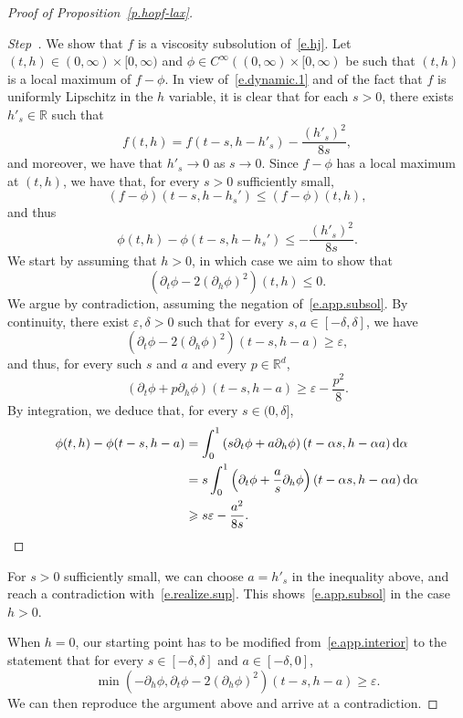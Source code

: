 \documentclass[10pt]{amsart}
\theoremstyle{definition}\newtheorem{defi}[theo]{Definition}\newtheorem{rema}[theo]{Remark}\newtheorem{exam}[theo]{Example}\newtheorem{exem}[theo]{Example}\newtheorem{nota}[theo]{Notation}
\newcommand{\R}{\mathbb{R}}
\newcommand{\Rd}{{\mathbb{R}^d}}
\renewcommand{\d}{\mathrm{d}}
\newcommand{\1}{\mathds{1}}
\newcommand{\ep}{\varepsilon}
\renewcommand{\le}{\leqslant}
\renewcommand{\ge}{\geqslant}
\newcommand{\de}{\delta}
\newcounter{stepcount}
\newenvironment{step}{\refstepcounter{stepcount}\begin{proof}[Step~\thestepcount]}{\let\qed\relax\end{proof}}
\begin{document}
\begin{proof}[Proof of Proposition~\ref{p.hopf-lax}]
\label{proofprop4.3Step5}
\begin{step}
We show that $f$ is a viscosity subsolution of~\eqref{e.hj}. Let $(t,h) \in (0,\infty)\times [0,\infty)$ and $\phi \in C^\infty((0,\infty)\times [0,\infty)$ be such that $(t,h)$ is a local maximum of $f-\phi$. In view of~\eqref{e.dynamic.1} and of the fact that $f$ is uniformly Lipschitz in the $h$ variable, it is clear that for each $s > 0$, there exists $h'_s \in \R$ such that
\[
f(t,h) = f(t-s,h-h'_s) - \frac{(h'_s)^2}{8s},
\]
and moreover, we have that $h'_s \to 0$ as $s \to 0$. Since $f-\phi$ has a local maximum at $(t,h)$, we have that, for every $s > 0$ sufficiently small,
\[
(f-\phi)(t-s,h-h_s') \le (f-\phi)(t,h),
\]
and thus
\begin{equation}\label{e.realize.sup}
\phi(t,h) - \phi(t-s,h-h_s') \le - \frac{(h'_s)^2}{8s}.
\end{equation}
We start by assuming that $h > 0$, in which case we aim to show that
\begin{equation}\label{e.app.subsol}
\left(\partial_t \phi - 2 (\partial_h \phi)^2 \right) (t,h) \le 0.
\end{equation}
We argue by contradiction, assuming the negation of~\eqref{e.app.subsol}. By continuity, there exist $\ep, \de > 0$ such that for every $s, a \in [-\de,\de]$, we have
\begin{equation}\label{e.app.interior}
\left(\partial_t \phi - 2 (\partial_h \phi)^2 \right) (t-s,h-a) \ge \ep,
\end{equation}
and thus, for every such $s$ and $a$ and every $p \in \Rd$,
\[
\left(\partial_t \phi + p \partial_h \phi\right) (t-s,h-a) \ge \ep - \frac{p^2}{8}.
\]
By integration, we deduce that, for every $s \in (0,\de]$,
\begin{align*}
\notag
\phi(t,h) - \phi(t-s,h-a) & = \int_0^1 \left(s\partial_t \phi + a \partial_h \phi\right)(t-\alpha s, h - \alpha a) \, \d \alpha
\\
\notag & = s \int_0^1 \left(\partial_t \phi + \frac{a}{s} \partial_h \phi\right)(t-\alpha s, h - \alpha a) \, \d \alpha
\\
&
\ge s\ep - \frac{a^2}{8s}.
\end{align*}
\end{step}

For $s > 0$ sufficiently small, we can choose $a = h'_s$ in the inequality above, and reach a contradiction with~\eqref{e.realize.sup}. This shows~\eqref{e.app.subsol} in the case $h > 0$.


When $h = 0$, our starting point has to be modified from~\eqref{e.app.interior} to the statement that for every $s \in [-\de,\de]$ and $a \in [-\delta,0]$,
\[
\min \left(-\partial_h \phi, \partial_t \phi - 2 (\partial_h \phi)^2 \right)(t-s,h-a) \ge \ep.
\]
We can then reproduce the argument above and arrive at a contradiction.
\end{proof}
\end{document}

